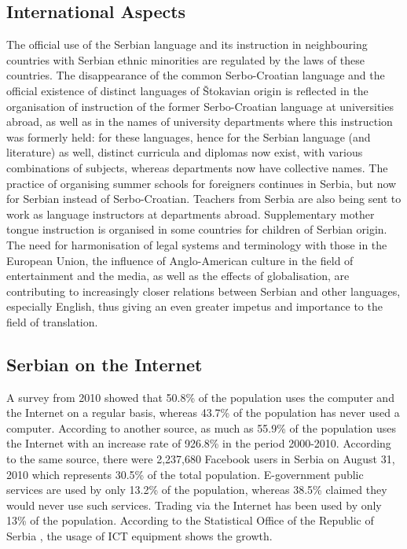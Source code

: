 \begin{multicols}{2}
 \subsection {International Aspects}
    
The official use of the Serbian language and its instruction in neighbouring countries with Serbian ethnic minorities are regulated by the laws of these countries. 
The disappearance of the common Serbo-Croatian language and the official existence of distinct languages of Štokavian origin is reflected in the organisation of instruction of the former Serbo-Croatian language at universities abroad, as well as in the names of university departments where this instruction was formerly held: for these languages, hence for the Serbian language (and literature) as well, distinct curricula and diplomas now exist, with various combinations of subjects, whereas departments now have collective names.
The practice of organising summer schools for foreigners continues in Serbia, but now for Serbian instead of Serbo-Croatian. Teachers from Serbia are also being sent to work as language instructors at departments abroad. 
Supplementary mother tongue instruction is organised in some countries for children of Serbian origin. 
The need for harmonisation of legal systems and terminology with those in the European Union, the influence of Anglo-American culture in the field of entertainment and the media, as well as the effects of globalisation, are contributing to increasingly closer relations between Serbian and other languages, especially English, thus giving an even greater impetus and importance to the field of translation.
 
 \subsection {Serbian on the Internet}

A survey \cite{PKEY204} from 2010 showed that 50.8\% of the population uses the computer and the Internet on a regular basis, whereas 43.7\% of the population has never used a computer. According to another source, \cite{EUROPA2} as much as 55.9\% of the population uses the Internet with an increase rate of 926.8\% in the period 2000-2010. According to the same source, there were 2,237,680 Facebook users in Serbia on August 31, 2010 which represents 30.5\% of the total population. E-government public services are used by only 13.2\% of the population, whereas 38.5\% claimed they would never use such services. Trading via the Internet has been used by only 13\% of the population.  According to the Statistical Office of the Republic of Serbia \cite{WEBRZS}, the usage of ICT equipment shows the growth.


\end{multicols}
